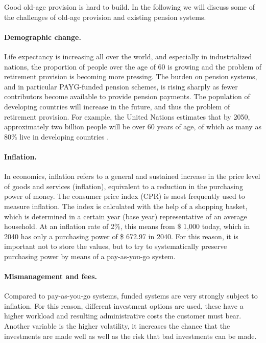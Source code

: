 Good old-age provision is hard to build. In the following we will discuss some of the challenges of old-age provision and existing pension systems.

\paragraph{Demographic change.} Life expectancy is increasing all over the world, and especially in industrialized nations, the proportion of people over the age of 60 is growing and the problem of retirement provision is becoming more pressing. The burden on pension systems, and in particular PAYG-funded pension schemes, is rising sharply as fewer contributors become available to provide pension payments. The population of developing countries will increase in the future, and thus the problem of retirement provision. For example, the United Nations estimates that by 2050, approximately two billion people will be over 60 years of age, of which as many as 80\% live in developing countries
\cite{noauthor_pensions_2009}.


\paragraph{Inflation.}  In economics, inflation refers to a general and sustained increase in the price level of goods and services (inflation), equivalent to a reduction in the purchasing power of money. The consumer price index (CPR) is most frequently used to measure inflation. The index is calculated with the help of a shopping basket, which is determined in a certain year (base year) representative of an average household. \cite{inflation} 
At an inflation rate of 2\%, this means from \$ 1,000 today, which in 2040 has only a purchasing power of \$ 672.97 in 2040. 
For this reason, it is important not to store the values, but to try to systematically preserve purchasing power by means of a pay-as-you-go system.

\paragraph{Mismanagement and fees.} Compared to pay-as-you-go systems, funded systems are very strongly subject to inflation. For this reason, different investment options are used, these have a higher workload and resulting administrative costs the customer must bear. Another variable is the higher volatility, it increases the chance that the investments are made well as well as the risk that bad investments can be made.

